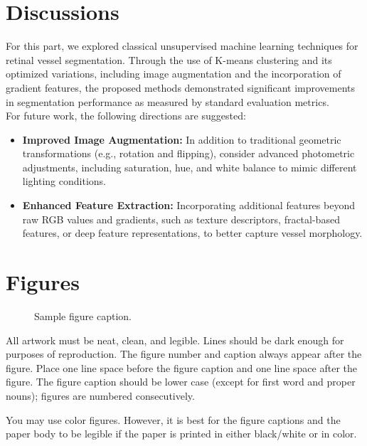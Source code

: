 \documentclass[final]{article}
\begin{document}
\section{Discussions}
For this part, we explored classical unsupervised machine learning techniques for retinal vessel segmentation. Through the use of K-means clustering and its optimized variations, including image augmentation and the incorporation of gradient features, the proposed methods demonstrated significant improvements in segmentation performance as measured by standard evaluation metrics. \\
For future work, the following directions are suggested:
\begin{itemize}
    \item \textbf{Improved Image Augmentation:} In addition to traditional geometric transformations (e.g., rotation and flipping), consider advanced photometric adjustments, including saturation, hue, and white balance to mimic different lighting conditions. 
    \item \textbf{Enhanced Feature Extraction:} Incorporating additional features beyond raw RGB values and gradients, such as texture descriptors, fractal-based features, or deep feature representations, to better capture vessel morphology.
\end{itemize}
\newpage











\section{Figures}


\begin{figure}[H]
    \centering
    \fbox{\rule[-.5cm]{0cm}{4cm} \rule[-.5cm]{4cm}{0cm}}
    \caption{Sample figure caption.}
\end{figure}


All artwork must be neat, clean, and legible. Lines should be dark enough for
purposes of reproduction. The figure number and caption always appear after the
figure. Place one line space before the figure caption and one line space after
the figure. The figure caption should be lower case (except for first word and
proper nouns); figures are numbered consecutively.


You may use color figures.  However, it is best for the figure captions and the
paper body to be legible if the paper is printed in either black/white or in
color.
\end{document}
